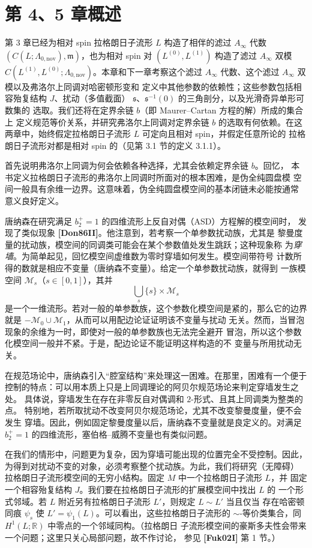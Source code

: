 
\section{第 4、5 章概述}
\label{sec:4-1}

第 3 章已经为相对 spin 拉格朗日子流形 $L$ 构造了相伴的滤过
$A_\infty$ 代数 $(C(L;\Lambda_{0,\mathrm{nov}}),\mathfrak m)$，也为相对
spin 对 $(L^{(0)},L^{(1)})$ 构造了滤过 $A_\infty$ 双模
$C(L^{(1)},L^{(0)};\Lambda_{0,\mathrm{nov}})$。本章和下一章考察这个滤过
$A_\infty$ 代数、这个滤过 $A_\infty$ 双模以及弗洛尔上同调对哈密顿形变和
定义中其他参数的依赖性；这些参数包括相容殆复结构 $J$、扰动（多值截面）
$\mathfrak s$、$\mathfrak s^{-1}(0)$ 的三角剖分，以及光滑奇异单形可数集的
选取。我们还将在定界余链 $b$（即 Maurer--Cartan 方程的解）所成的集合上
定义规范等价关系，并研究弗洛尔上同调对定界余链 $b$ 的选取有何依赖。在这
两章中，始终假定拉格朗日子流形 $L$ 可定向且相对 spin，并假定任意所论的
拉格朗日子流形对都是相对 spin 的（见第 3.1 节的定义 3.1.1）。

首先说明弗洛尔上同调为何会依赖各种选择，尤其会依赖定界余链 $b$。回忆，
本书定义拉格朗日子流形的弗洛尔上同调时所面对的根本困难，是伪全纯圆盘模
空间一般具有余维一边界。这意味着，伪全纯圆盘模空间的基本闭链未必能按通常
意义良好定义。

唐纳森在研究满足 $b_2^+=1$ 的四维流形上反自对偶（ASD）方程解的模空间时，
发现了类似现象 \textbf{[Don86II]}。他注意到，若考察一个单参数扰动族，尤其是
黎曼度量的扰动族，模空间的同调类可能会在某个参数值处发生跳跃；这种现象称
为\emph{穿墙}。为简单起见，回忆模空间虚维数为零时穿墙如何发生。模空间带符号
计数所得的数就是相应不变量（唐纳森不变量）。给定一个单参数扰动族，就得到
一族模空间 $\mathcal M_s$（$s\in[0,1]$），其并
\[
  \bigcup_s\{s\}\times\mathcal M_s
\]
是一个一维流形。若对一般的单参数族，这个参数化模空间是紧的，那么它的边界
就是 $-\mathcal M_0\cup\mathcal M_1$，从而可以用配边论证证明该不变量与扰动
无关。然而，当冒泡现象的余维为一时，即使对一般的单参数族也无法完全避开
冒泡，所以这个参数化模空间一般并不紧。于是，配边论证不能证明这样构造的不
变量与所用扰动无关。

在规范场论中，唐纳森引入“腔室结构”来处理这一困难。在那里，困难有一个便于
控制的特点：可以用本质上只是上同调理论的阿贝尔规范场论来判定穿墙发生之处。
具体说，穿墙发生在存在非零反自对偶调和 $2$-形式、且其上同调类为整类的点。
特别地，若所取扰动不改变阿贝尔规范场论，尤其不改变黎曼度量，便不会发生
穿墙。因此，例如固定黎曼度量以后，唐纳森不变量就是良定义的。对满足
$b_2^+=1$ 的四维流形，塞伯格--威腾不变量也有类似问题。

在我们的情形中，问题更为复杂，因为穿墙可能出现的位置完全不受控制。因此，
为得到对扰动不变的对象，必须考察整个扰动族。为此，我们将研究（无障碍）
拉格朗日子流形模空间的无穷小结构。固定 $M$ 中一个拉格朗日子流形 $L$，并
固定一个相容殆复结构 $J$。我们要在拉格朗日子流形的扩展模空间中找出 $L$ 的
一个形式邻域。若 $L$ 附近另有拉格朗日子流形 $L'$，则规定 $L\sim L'$ 当且仅当
存在哈密顿同痕 $\psi_s$ 使 $L'=\psi_1(L)$。可以看出，这些拉格朗日子流形的
$\sim$-等价类集合，同 $H^1(L;\mathbb R)$ 中零点的一个邻域同构。（拉格朗日
子流形模空间的豪斯多夫性会带来一个问题；这里只关心局部问题，故不作讨论，
参见 \textbf{[Fuk02I]} 第 1 节。）

